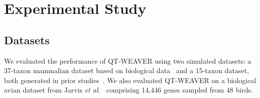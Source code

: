 \documentclass[runningheads]{llncs}
\begin{document}
\vspace{-10pt}
\section{Experimental Study}
\vspace{-5pt}
\subsection{Datasets}
%
\vspace{-5pt}
We evaluated the performance of QT-WEAVER using two simulated datasets: a 37-taxon mammalian dataset based on biological data~\cite{song-mammal} and a 15-taxon dataset, both generated in prior studies~\cite{statistical-binning,bayzid2015weighted}. 
We also evaluated QT-WEAVER on a biological avian dataset from Jarvis \textit{et al.}~\cite{jarvis2014} comprising 14,446 genes sampled from 48 birds.

\vspace{-10pt}
\end{document}
